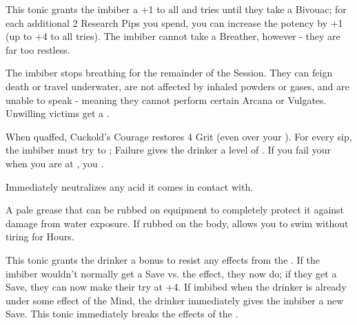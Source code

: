 This tonic grants the imbiber a +1 to all \RO and \RB tries until they take a Bivouac; for each additional 2 Research Pips you spend, you can increase the potency by +1 (up to +4 to all tries).  The imbiber cannot take a Breather, however - they are far too restless.


  \CHYMISTRY[
    Name=Cold and Drowsy Humor,
    Link=chymistry-cold-drowsy-humor,
    Type=Powder,
    Pips=5,
    Time=Days
  ]

  The imbiber stops breathing for the remainder of the Session.  They can feign death or travel underwater, are not affected by inhaled powders or gases, and are unable to speak - meaning they cannot perform certain Arcana or Vulgates.  Unwilling victims get a .

\CHYMISTRY[
  Name=Cuckold's Courage,
  Link=chymistry-cuckold-courage,
  Type=Tonic,
  Pips=2,
  Time=Days
]

When quaffed, Cuckold's Courage restores 4 Grit (even over your \MAX). For every sip, the imbiber must try to \RSTRY{\VIG}; Failure gives the drinker a level of . If you fail your \RSTRY{\VIG} when you are at , you .


  \CHYMISTRY[
    Name=Dastin's Basic Talc,
    Link=chymistry-dastins-basic-talc,
    Type=Powder,
    Pips=5,
    Time=Days
  ]


  Immediately neutralizes any acid it comes in contact with. 


  \CHYMISTRY[
    Name=Faivre's Aqua Grease,
    Link=chymistry-faivres-aqua-grease,
    Type=Unguent,
    Pips=2,
    Time=Days
  ]

  A pale grease that can be rubbed on equipment to completely protect it against damage from water exposure. If rubbed on the body, allows you to swim without tiring for Hours.


\CHYMISTRY[
  Name=Fulcanelli's Clarifying Elixir,
  Link=chymistry-fulcanelli-clarifying-elixir,
  Type=Tonic,
  Pips=5,
  Time=Weeks
]

This tonic grants the drinker a bonus to resist any effects from the . If the imbiber wouldn't normally get a Save vs. the effect, they now do; if they  get a Save, they can now make their try at +4.  If imbibed when the drinker is already under some effect of the Mind, the drinker immediately gives the imbiber a new Save.  This tonic immediately breaks the effects of the .




